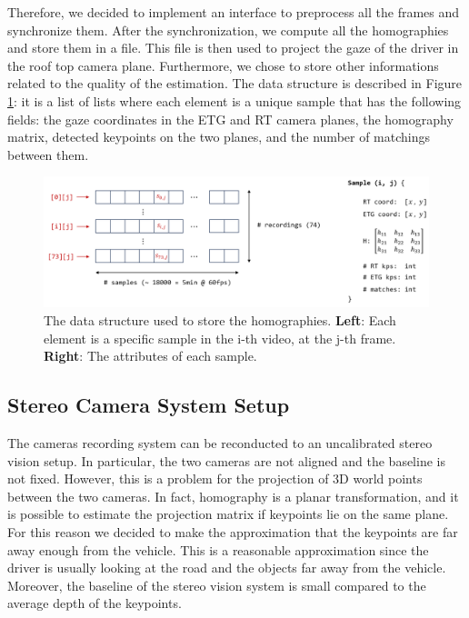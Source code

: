 Therefore, we decided to implement 
an interface to preprocess all the frames and synchronize them.
After the synchronization, we compute all the homographies and store them in a 
file. This file is then used to project the gaze of the driver in the roof top 
camera plane.
Furthermore, we chose to store other informations related to the quality of the 
estimation.
The data structure is described in Figure \ref{fig:homography_data_structure}:
it is a list of lists where each element is a unique sample that has the 
following fields: the gaze coordinates in the ETG and RT camera planes, the 
homography matrix, detected keypoints on the two planes, and the number of 
matchings between them.

\begin{figure}
    \centering
    \includegraphics[width=\textwidth]{images/dreyeve/homography_data.png}
    \caption{The data structure used to store the homographies.
    \textbf{Left}: Each element is a specific sample in the i-th video, at 
    the j-th frame.
    \textbf{Right}: The attributes of each sample.}
    \label{fig:homography_data_structure}
\end{figure}

\subsection{Stereo Camera System Setup}
The cameras recording system can be reconducted to an uncalibrated stereo vision 
setup. In particular, the two cameras are not aligned and the baseline is not 
fixed. However, this is a problem for the projection of 3D world points between 
the two cameras. In fact, homography is a planar transformation, 
and it is possible to estimate the projection matrix if keypoints lie on the 
same plane.
For this reason we decided to make the approximation that the 
keypoints are far away enough from the vehicle. This is a reasonable 
approximation since the driver is usually looking at the road and the objects 
far away from the vehicle. Moreover, the baseline of the stereo vision system is 
small compared to the average depth of the keypoints.


